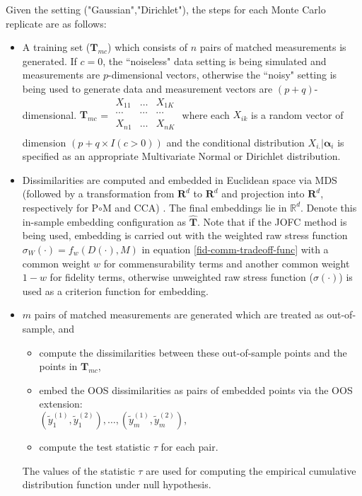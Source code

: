 \documentclass[11pt]{article} %
\begin{document}
Given the setting ("Gaussian","Dirichlet"),   the steps for each Monte Carlo replicate are as follows:
\begin{itemize}
\item A training set ($\mathbf{T}_{mc}$) which consists of  $n$ pairs of matched measurements is generated.  If $c=0$, the ``noiseless" data setting is being simulated and measurements are $p$-dimensional vectors, otherwise  the ``noisy" setting is being used to generate data and measurement vectors are $(p+q)$-dimensional. $ \mathbf{T}_{mc}$ = 
$\begin{array}{ccc}
        X_{11} & \ldots & X_{1K} \\
        \cdots & \cdots      & \cdots   \\ 
        X_{n1} & \ldots     & X_{nK} \\
    \end{array}
$
 where each $X_{ik}$ is a random vector of dimension $(p+q \times I(c>0))$ and the conditional distribution  $X_{i.}|\bm{\alpha}_i  $ is specified as an appropriate Multivariate Normal or Dirichlet distribution.
\item Dissimilarities are computed and embedded in  Euclidean space  via MDS (followed by a transformation from  $\mathbf{R}^d$ to  $\mathbf{R}^d$ and  projection into $\mathbf{R}^d$, respectively  for P$\circ$M and CCA) . The final embeddings lie in $\mathbb{R}^d$.   Denote this in-sample embedding configuration as   $\hat{\mathbf{T}}$. Note that  if the JOFC method is being used, embedding is carried out with the weighted raw stress function $\sigma_{W}(\cdot)=f_{w}(D(\cdot),M)$ in equation \eqref{fid-comm-tradeoff-func} with a common weight $w$ for commensurability terms and another common weight $1-w$ for fidelity terms, otherwise unweighted raw stress function ($\sigma(\cdot)$) is used as a criterion function for embedding.

\item  $m$ pairs of matched   measurements are generated which are treated as out-of-sample, and 
\begin{itemize}
\item compute the dissimilarities  %
 between these out-of-sample  points and the points in ${\mathbf{T}_{mc}}$,  
\item  embed the OOS dissimilarities as pairs of embedded points via the OOS extension:\\
 $(\tilde{y}_1^{(1)},\tilde{y}_1^{(2)}),\ldots, (\tilde{y}_m^{(1)},\tilde{y}_m^{(2)})$, 
\item compute the test statistic $\tau$ for each pair.%
\end{itemize}
 The values of the statistic $\tau$ are used for computing  the empirical cumulative distribution function under null hypothesis. 


\end{itemize}
\end{document}
